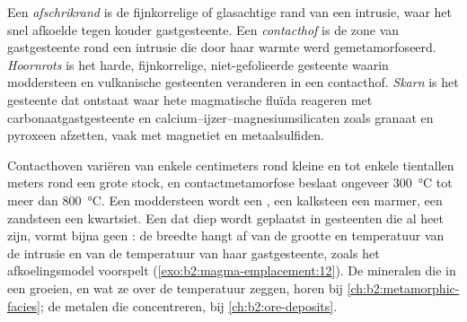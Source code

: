 \begin{definition}\label{def:b2:magma-emplacement:aureole}
Een \emph{afschrikrand} is de fijnkorrelige of glasachtige rand van een
intrusie, waar het  snel afkoelde tegen kouder gastgesteente. Een
\emph{contacthof} is de zone van gastgesteente rond een
intrusie die door haar warmte werd gemetamorfoseerd. \emph{Hoornrots} is het
harde, fijnkorrelige, niet-gefolieerde gesteente waarin moddersteen en vulkanische gesteenten veranderen in
een contacthof. \emph{Skarn} is het gesteente dat ontstaat waar hete magmatische
fluïda reageren met carbonaatgastgesteente en
calcium--ijzer--magnesiumsilicaten zoals granaat en pyroxeen afzetten, vaak met magnetiet en metaalsulfiden.
\end{definition}

Contacthoven variëren van enkele centimeters rond kleine  en  tot
enkele tientallen meters rond een grote stock, en contactmetamorfose beslaat
ongeveer \qty{300}{\celsius} tot meer dan \qty{800}{\celsius}. Een moddersteen wordt een
, een kalksteen een marmer, een zandsteen een kwartsiet. Een  dat diep
wordt geplaatst in gesteenten die al heet zijn, vormt bijna geen : de breedte hangt af van de
grootte en temperatuur van de intrusie en van de temperatuur van haar gastgesteente, zoals
het afkoelingsmodel voorspelt (\cref{exo:b2:magma-emplacement:12}). De mineralen die in een  groeien,
en wat ze over de temperatuur zeggen, horen bij \cref{ch:b2:metamorphic-facies};
de metalen die  concentreren, bij \cref{ch:b2:ore-deposits}.

